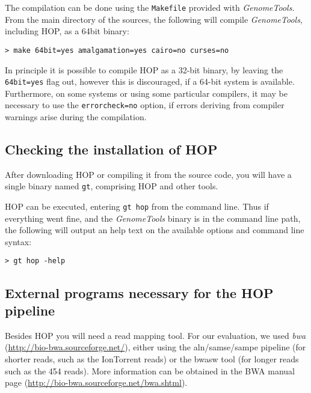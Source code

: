 \documentclass[12pt,titlepage]{article}
\newcommand{\GenomeTools}{\textit{GenomeTools}\xspace}
\newcommand{\Hop}{{HOP}\xspace}
\newcommand{\Gtcmd}{\texttt{gt}\xspace}
\begin{document}
The compilation can be done using the \texttt{Makefile} provided with
\GenomeTools. From the main directory of the sources, the following will
compile \GenomeTools, including \Hop, as a 64bit binary:

\begin{footnotesize}
\begin{verbatim}
> make 64bit=yes amalgamation=yes cairo=no curses=no
\end{verbatim}
\end{footnotesize}

In principle it is possible to compile \Hop as a 32-bit binary, by
leaving the \texttt{64bit=yes} flag out, however this is discouraged,
if a 64-bit system is available. Furthermore, on some systems
or using some particular compilers, it may be necessary to use the
\texttt{errorcheck=no} option, if errors deriving from compiler warnings
arise during the compilation.

\subsection{Checking the installation of \Hop}

After downloading \Hop or compiling it from the source code, you
will have a single binary named \Gtcmd, comprising \Hop and other tools.

\Hop can be executed, entering \texttt{gt hop} from the command line.
Thus if everything went fine, and the \GenomeTools binary is in
the command line path, the following will output an help text on the
available options and command line syntax:

\begin{footnotesize}
\begin{verbatim}
> gt hop -help
\end{verbatim}
\end{footnotesize}

\subsection{External programs necessary for the \Hop pipeline}

Besides \Hop you will need a read mapping tool. For our evaluation,
we used \textit{bwa} (\url{http://bio-bwa.sourceforge.net/}),
either using the aln/samse/sampe pipeline (for shorter reads, such
as the IonTorrent reads) or the bwasw tool (for longer reads such as
the 454 reads). More information can be obtained
in the BWA manual page (\url{http://bio-bwa.sourceforge.net/bwa.shtml}).
\end{document}
